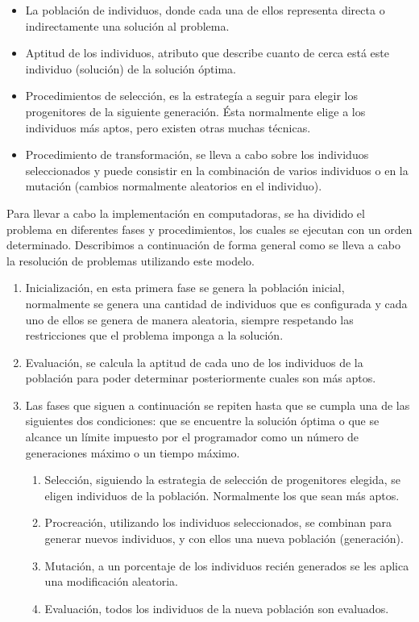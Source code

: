 \begin{itemize}
	\item La población de individuos, donde cada una de ellos representa directa o indirectamente una solución al problema.
	\item Aptitud de los individuos, atributo que describe cuanto de cerca est\'a este individuo (solución) de la solución \'optima. 
	\item Procedimientos de selección, es la estrateg\'ia a seguir para elegir los progenitores de la siguiente generaci\'on. \'Esta normalmente elige a los individuos m\'as aptos, pero existen otras muchas técnicas.
	\item Procedimiento de transformaci\'on, se lleva a cabo sobre los individuos seleccionados y puede consistir en la combinación de varios individuos o en la mutación (cambios normalmente aleatorios en el individuo).
\end{itemize}

Para llevar a cabo la implementación en computadoras, se ha dividido el problema en diferentes fases y procedimientos, los cuales se ejecutan con un orden determinado. Describimos a continuación de forma general como se lleva a cabo la resolución de problemas utilizando este modelo.

\begin{enumerate}
	\item Inicializaci\'on, en esta primera fase se genera la población inicial, normalmente se genera una cantidad de individuos que es configurada y cada uno de ellos se genera de manera aleatoria, siempre respetando las restricciones que el problema imponga a la solución.
	\item Evaluaci\'on, se calcula la aptitud de cada uno de los individuos de la población para poder determinar posteriormente cuales son m\'as aptos.
	\item Las fases que siguen a continuación se repiten hasta que se cumpla una de las siguientes dos condiciones: que se encuentre la solución \'optima o que se alcance un l\'imite impuesto por el programador como un n\'umero de generaciones máximo o un tiempo máximo.
	\begin{enumerate}
		\item Selección, siguiendo la estrategia de selección de progenitores elegida, se eligen individuos de la población. Normalmente los que sean m\'as aptos.
		\item Procreaci\'on, utilizando los individuos seleccionados, se combinan para generar nuevos individuos, y con ellos una nueva población (generación).
		\item Mutaci\'on, a un porcentaje de los individuos recién generados se les aplica una modificación aleatoria.
		\item Evaluaci\'on, todos los individuos de la nueva poblaci\'on son evaluados.
	\end{enumerate}
\end{enumerate}

